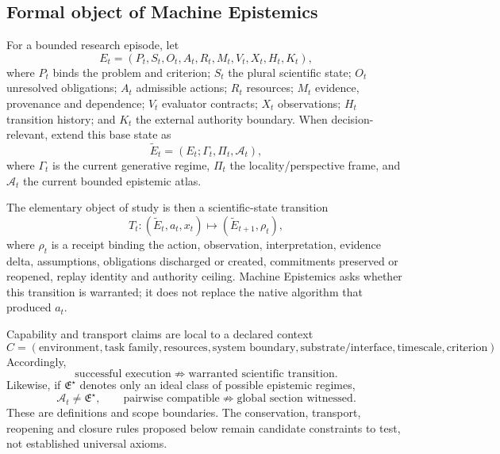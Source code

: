 \subsection{Formal object of Machine Epistemics}\label{formal-object-of-machine-epistemics}

For a bounded research episode, let
\[
E_t=(P_t,S_t,O_t,A_t,R_t,M_t,V_t,X_t,H_t,K_t),
\]
where $P_t$ binds the problem and criterion; $S_t$ the plural scientific state; $O_t$ unresolved obligations; $A_t$ admissible actions; $R_t$ resources; $M_t$ evidence, provenance and dependence; $V_t$ evaluator contracts; $X_t$ observations; $H_t$ transition history; and $K_t$ the external authority boundary. When decision-relevant, extend this base state as
\[
\widetilde E_t=(E_t;\Gamma_t,\Pi_t,\mathcal A_t),
\]
where $\Gamma_t$ is the current generative regime, $\Pi_t$ the locality/perspective frame, and $\mathcal A_t$ the current bounded epistemic atlas.

The elementary object of study is then a scientific-state transition
\[
T_t:(\widetilde E_t,a_t,x_t)\mapsto(\widetilde E_{t+1},\rho_t),
\]
where $\rho_t$ is a receipt binding the action, observation, interpretation, evidence delta, assumptions, obligations discharged or created, commitments preserved or reopened, replay identity and authority ceiling. Machine Epistemics asks whether this transition is warranted; it does not replace the native algorithm that produced $a_t$.

Capability and transport claims are local to a declared context
\[
C=(\text{environment},\text{task family},\text{resources},\text{system boundary},
\text{substrate/interface},\text{timescale},\text{criterion}).
\]
Accordingly,
\[
\text{successful execution}\not\Rightarrow\text{warranted scientific transition}.
\]
Likewise, if $\mathfrak E^{\star}$ denotes only an ideal class of possible epistemic regimes,
\[
\mathcal A_t\neq\mathfrak E^{\star},
\qquad
\text{pairwise compatible}\not\Rightarrow\text{global section witnessed}.
\]
These are definitions and scope boundaries. The conservation, transport, reopening and closure rules proposed below remain candidate constraints to test, not established universal axioms.
